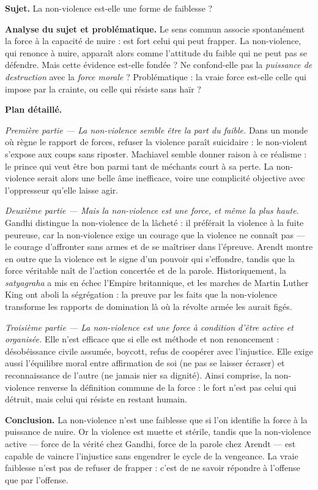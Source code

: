 \documentclass[11pt]{article}
\begin{document}
\begin{exoresolu}
\textbf{Sujet.} La non-violence est-elle une forme de faiblesse ?

\tcblower

\textbf{Analyse du sujet et problématique.} Le sens commun associe spontanément la force à la capacité de nuire : est fort celui qui peut frapper. La non-violence, qui renonce à nuire, apparaît alors comme l'attitude du faible qui ne peut pas se défendre. Mais cette évidence est-elle fondée ? Ne confond-elle pas la \emph{puissance de destruction} avec la \emph{force morale} ? Problématique : la vraie force est-elle celle qui impose par la crainte, ou celle qui résiste sans haïr ?

\textbf{Plan détaillé.}

\emph{Première partie — La non-violence semble être la part du faible.} Dans un monde où règne le rapport de forces, refuser la violence paraît suicidaire : le non-violent s'expose aux coups sans riposter. Machiavel semble donner raison à ce réalisme : le prince qui veut être bon parmi tant de méchants court à sa perte. La non-violence serait alors une belle âme inefficace, voire une complicité objective avec l'oppresseur qu'elle laisse agir.

\emph{Deuxième partie — Mais la non-violence est une force, et même la plus haute.} Gandhi distingue la non-violence de la lâcheté : il préférait la violence à la fuite peureuse, car la non-violence exige un courage que la violence ne connaît pas — le courage d'affronter sans armes et de se maîtriser dans l'épreuve. Arendt montre en outre que la violence est le signe d'un pouvoir qui s'effondre, tandis que la force véritable naît de l'action concertée et de la parole. Historiquement, la \emph{satyagraha} a mis en échec l'Empire britannique, et les marches de Martin Luther King ont aboli la ségrégation : la preuve par les faits que la non-violence transforme les rapports de domination là où la révolte armée les aurait figés.

\emph{Troisième partie — La non-violence est une force à condition d'être active et organisée.} Elle n'est efficace que si elle est méthode et non renoncement : désobéissance civile assumée, boycott, refus de coopérer avec l'injustice. Elle exige aussi l'équilibre moral entre affirmation de soi (ne pas se laisser écraser) et reconnaissance de l'autre (ne jamais nier sa dignité). Ainsi comprise, la non-violence renverse la définition commune de la force : le fort n'est pas celui qui détruit, mais celui qui résiste en restant humain.

\textbf{Conclusion.} La non-violence n'est une faiblesse que si l'on identifie la force à la puissance de nuire. Or la violence est muette et stérile, tandis que la non-violence active — force de la vérité chez Gandhi, force de la parole chez Arendt — est capable de vaincre l'injustice sans engendrer le cycle de la vengeance. La vraie faiblesse n'est pas de refuser de frapper : c'est de ne savoir répondre à l'offense que par l'offense.
\end{exoresolu}
\end{document}
